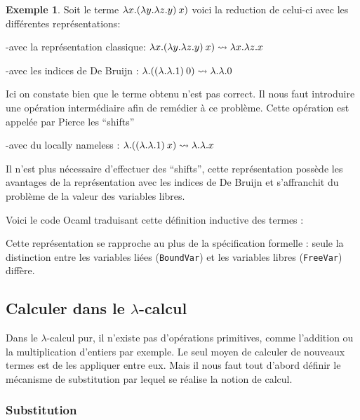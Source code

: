 \documentclass {article}
\newcommand{\codefrom}[3]
           {}
\theoremstyle{definition}
\newtheorem{example}{Exemple}
\theoremstyle{remark}
\begin{document}
\begin{example} 
  
  Soit le terme \(\lambda x. (\lambda y. \lambda z. y)\:x)\) voici la reduction de celui-ci 
  avec les différentes représentations:

  -avec la représentation classique:
\(\lambda x. (\lambda y. \lambda z. y)\:x) \leadsto \lambda x. \lambda z. x\)

  -avec les indices de De Bruijn : $\lambda . ((\lambda . \lambda . 1)\:0) \leadsto \lambda . \lambda . 0$

  Ici on constate bien que le terme obtenu n'est pas correct. Il nous faut introduire une opération
  intermédiaire afin de remédier à ce problème.
  Cette opération est appelée par Pierce les ``shifts''
  
  -avec du locally nameless : $\lambda . ((\lambda . \lambda . 1)\:x)\leadsto \lambda . \lambda . x$

  Il n'est plus nécessaire d'effectuer des ``shifts'', cette représentation
  possède les avantages de la représentation avec les indices de De Bruijn et
  s'affranchit du problème de la valeur des variables libres.
  
\end{example}

Voici le code Ocaml traduisant cette définition inductive des termes :
%
\codefrom{untyped}{lambda}{untyped_term}

Cette représentation se rapproche au plus de la spécification formelle
: seule la distinction entre les variables liées (\lstinline!BoundVar!)
et les variables libres (\lstinline!FreeVar!) diffère.



  
\subsection{Calculer dans le $\lambda$-calcul}
\label{calculer_dans_le_lambda_calcul}

Dans le $\lambda$-calcul pur, il n'existe pas d'opérations primitives, comme l'addition ou la multiplication d'entiers par exemple. Le seul moyen de calculer de nouveaux termes est de les appliquer 
entre eux. Mais il nous faut tout d'abord définir le mécanisme de substitution par lequel se réalise la notion de calcul.

\subsubsection{Substitution}
\end{document}
